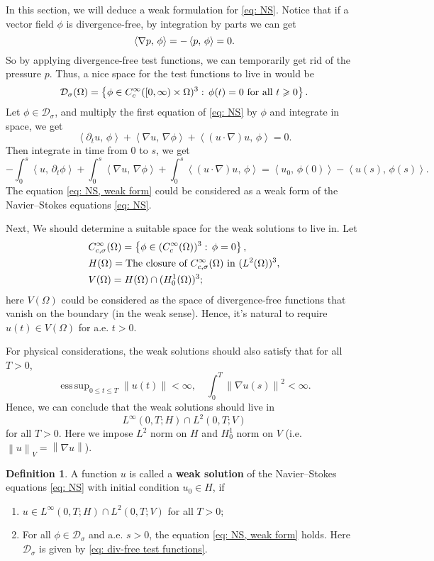 \documentclass[a4paper, 12pt, oneside]{amsart}
\theoremstyle{definition}
\newtheorem*{definition}{Definition}
\theoremstyle{remark}
\let\div\relax\DeclareMathOperator{\div}{div}
\DeclareMathOperator*{\esssup}{ess\,sup}
\newcommand{\norm}[1]{\left\lVert #1 \right\rVert}
\newcommand{\bk}[2]{\left\langle #1,\, #2 \right\rangle}
\newcommand{\set}[1]{\left\{ #1 \right\}}
\renewcommand{\mid}{:\,}
\renewcommand{\leq}{\leqslant}
\renewcommand{\geq}{\geqslant}
\newcommand{\p}{\partial}
\newcommand{\mc}[1]{\mathcal{#1}}
\newcommand{\ds}{\displaystyle}
\begin{document}
In this section, we will deduce a weak formulation for \eqref{eq: NS}. Notice that if a vector field $\phi$ is divergence-free, by integration by parts we can get
\[
    \bk{\nabla p}{\phi} = -\bk{p}{\div\phi} = 0.
\]
So by applying divergence-free test functions, we can temporarily get rid of the pressure $p$. Thus, a nice space for the test functions to live in would be
\begin{equation}
    \label{eq: div-free test functions}
    \mc{D}_\sigma(\Omega) = \set{\phi\in C_c^\infty([0, \infty)\times\Omega)^3\mid \div\phi(t) = 0\ \text{for all $t
    \geq 0$}}.
\end{equation}
Let $\phi\in\mc{D}_\sigma$, and multiply the first equation of \eqref{eq: NS} by $\phi$ and integrate in space, we get
\[
    \bk{\p_t u}{\phi} + \bk{\nabla u}{\nabla\phi} + \bk{(u\cdot\nabla)u}{\phi} = 0.
\]
Then integrate in time from 0 to $s$, we get
\begin{equation}
    \label{eq: NS, weak form}
    -\int_0^s\bk{u}{\p_t\phi} + \int_0^s\bk{\nabla u}{\nabla\phi} + \int_0^s \bk{(u\cdot\nabla)u}{\phi} = \bk{u_0}{\phi(0)} - \bk{u(s)}{\phi(s)}.
\end{equation}
The equation \eqref{eq: NS, weak form} could be considered as a weak form of the Navier--Stokes equations \eqref{eq: NS}.

Next, We should determine a suitable space for the weak solutions to live in. Let
\begin{align*}
    &C^\infty_{c,\sigma}(\Omega) = \set{\phi\in (C_c^\infty(\Omega))^3\mid\div\phi=0},\\
    &H(\Omega) = \text{The closure of $C^\infty_{c,\sigma}(\Omega)$ in $(L^2(\Omega))^3$},\\
    &V(\Omega) = H(\Omega)\cap (H^1_0(\Omega))^3;
\end{align*}
here $V(\Omega)$ could be considered as the space of divergence-free functions that vanish on the boundary (in the weak sense). Hence, it's natural to require $u(t)\in V(\Omega)$ for a.e. $t>0$.

For physical considerations, the weak solutions should also satisfy that for all $T>0$, 
\[
    \esssup_{0\leq t\leq T}\norm{u(t)} < \infty,\quad \int_{0}^T\norm{\nabla u(s)}^2\ds<\infty.
\]
Hence, we can conclude that the weak solutions should live in
\[
    L^\infty(0, T; H)\cap L^2(0, T; V)
\]
for all $T>0$. Here we impose $L^2$ norm on $H$ and $H_0^1$ norm on $V$ (i.e. $\norm{u}_V=\norm{\nabla u}$).

\begin{definition}
    A function $u$ is called a \textbf{weak solution} of the Navier--Stokes equations \eqref{eq: NS} with initial condition $u_0\in H$, if
    \begin{enumerate}
        \item $u\in L^\infty(0, T; H)\cap L^2(0, T; V)$ for all $T>0$;
        \item For all  $\phi\in\mc{D}_\sigma$ and a.e. $s>0$, the equation \eqref{eq: NS, weak form} holds. Here $\mc{D}_\sigma$ is given by \eqref{eq: div-free test functions}.
    \end{enumerate}
\end{definition}
\end{document}
